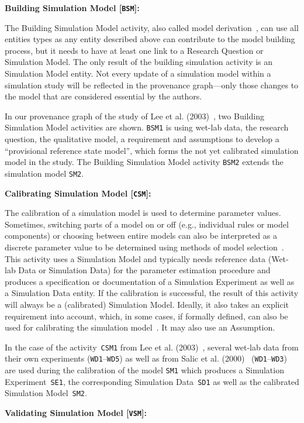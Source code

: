 \documentclass[10pt,letterpaper]{article}
\newcommand{\lee}{Lee et al. (2003)}
\newcommand{\RQ}{Research Question}
\newcommand{\A}{Assumption}
\newcommand{\SM}{Simulation Model}
\newcommand{\SE}{Simulation Experiment}
\newcommand{\SD}{Simulation Data}
\newcommand{\WD}{Wet-lab Data}
\newcommand{\BSM}{Building Simulation Model}
\newcommand{\CSM}{Calibrating Simulation Model}
\newcommand{\VSM}{Validating Simulation Model}
\begin{document}
\textbf{\BSM{} [\texttt{BSM}]:}

\noindent The \BSM{} activity, also called model derivation~\cite{Vera2021}, can use all entities types as any entity described above can contribute to the model building process, but it needs to have at least one link to a \RQ{} or \SM{}.
The only result of the building simulation activity is an \SM{} entity.
Not every update of a simulation model within a simulation study will be reflected in the provenance graph---only those changes to the model that are considered essential by the authors.

In our provenance graph of the study of \lee{}~\cite{Lee2003}, two \BSM{} activities are shown.
\texttt{BSM1} is using wet-lab data, the research question, the qualitative model, a requirement and assumptions to develop a \enquote{provisional reference state model}, which forms the not yet calibrated simulation model in the study.
The \BSM{} activity \texttt{BSM2} extends the simulation model \texttt{SM2}.


\textbf{\CSM{} [\texttt{CSM}]:}

\noindent The calibration of a simulation model is used to determine parameter values.
Sometimes, switching parts of a model on or off (e.g., individual rules or model components) or choosing between entire models can also be interpreted as a discrete parameter value to be determined using methods of model selection~\cite{Toni2009}.
This activity uses a \SM{} and typically needs reference data (\WD{} or \SD{}) for the parameter estimation procedure and produces a specification or documentation of a \SE{} as well as a \SD{} entity.
If the calibration is successful, the result of this activity will always be a (calibrated) \SM{}.
Ideally, it also takes an explicit requirement into account, which, in some cases, if formally defined, can also be used for calibrating the simulation model~\cite{Palaniappan2013, Mitra2019}.
It may also use an \A{}.

In the case of the activity~\texttt{CSM1} from \lee{}~\cite{Lee2003}, several wet-lab data from their own experiments (\texttt{WD1}--\texttt{WD5}) as well as from Salic et al. (2000)~\cite{Salic2000} (\texttt{WD1}--\texttt{WD3}) are used during the calibration of the model \texttt{SM1} which produces a \SE{}~\texttt{SE1}, the corresponding \SD{}~\texttt{SD1} as well as the calibrated \SM{}~\texttt{SM2}.


\textbf{\VSM{} [\texttt{VSM}]:}
\end{document}
